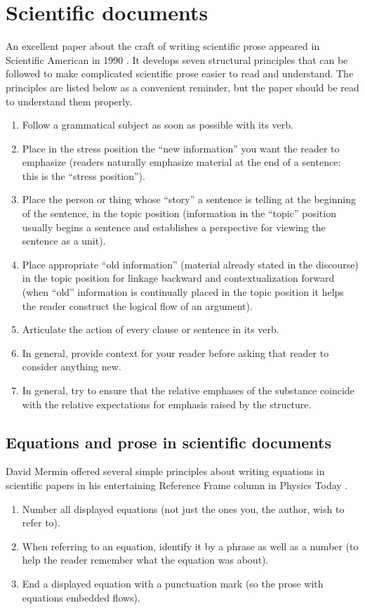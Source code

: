 \section{Scientific documents}
 \label{s:scientific_documents}
An excellent paper about the craft of writing scientific prose appeared in Scientific American in 1990 \cite{GopenAndSwan}. It develops seven structural principles that can be followed to make complicated scientific prose easier to read and understand. The principles are listed below as a convenient reminder, but the paper should be read to understand them properly.
\begin{enumerate}

\item	Follow a grammatical subject as soon as possible with its verb.
\item	Place in the stress position the ``new information'' you want the reader to emphasize (readers naturally emphasize material at the end of a sentence: this is the ``stress position'').
\item	Place the person or thing whose ``story'' a sentence is telling at the beginning of the sentence, in the topic position (information in the ``topic'' position usually begins a sentence and establishes a perspective for viewing the sentence as a unit). 
\item	Place appropriate ``old information'' (material already stated in the discourse) in the topic position for linkage backward and contextualization forward (when ``old'' information is continually placed in the topic position it helps the reader construct the logical flow of an argument). 
\item	Articulate the action of every clause or sentence in its verb. 
\item	In general, provide context for your reader before asking that reader to consider anything new. 
\item	In general, try to ensure that the relative emphases of the substance coincide with the relative expectations for emphasis raised by the structure.
\end{enumerate}

\subsection{Equations and prose in scientific documents}
David Mermin offered several simple principles about writing equations in scientific papers in his entertaining Reference Frame column in Physics Today \cite{Mermin}.
\begin{enumerate}

\item	Number all displayed equations (not just the ones you, the author, wish to refer to).
\item When referring to an equation, identify it by a phrase as well as a number (to help the reader remember what the equation was about).
\item	End a displayed equation with a punctuation mark (so the prose with equations embedded flows).

\end{enumerate}

